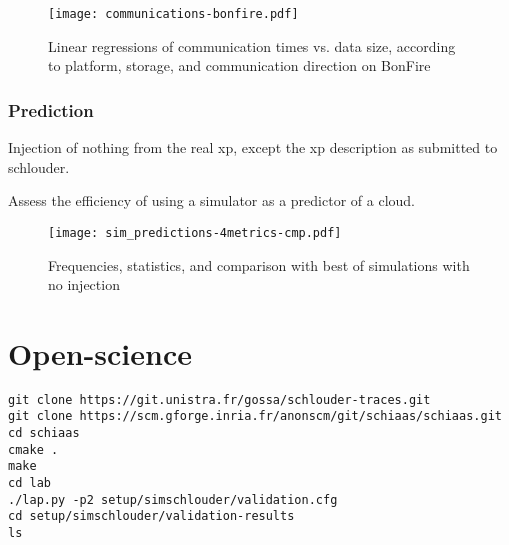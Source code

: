 \begin{figure}
  \centering
  \texttt{[image: communications-bonfire.pdf]}
  
  \caption{Linear regressions of communication times vs. data size, 
    according to platform, storage, and communication direction on BonFire}
\end{figure} 


\subsubsection{Prediction}

Injection of nothing from the real xp, except the xp description as submitted 
to schlouder.

Assess the efficiency of using a simulator as a predictor of a cloud.

\begin{figure}
  \centering
  \texttt{[image: sim\_predictions-4metrics-cmp.pdf]}
 
  
  
  

  
  \caption{Frequencies, statistics, and comparison with best of simulations with no injection}
\end{figure} 

\section{Open-science}

\begin{verbatim}
git clone https://git.unistra.fr/gossa/schlouder-traces.git
git clone https://scm.gforge.inria.fr/anonscm/git/schiaas/schiaas.git 
cd schiaas
cmake .
make
cd lab
./lap.py -p2 setup/simschlouder/validation.cfg
cd setup/simschlouder/validation-results
ls
\end{verbatim}





